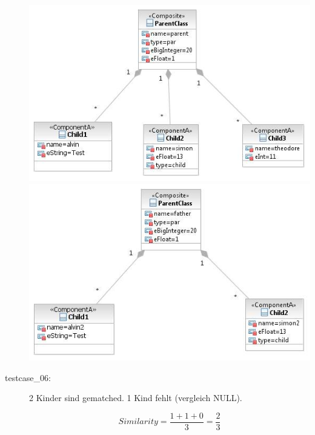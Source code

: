\documentclass[a4paper]{article}
\begin{document}
\begin{description}
	\includegraphics[scale=0.5]{CompareChildrenMatchedOrSimilarTestScreens/Testcase05model1.jpeg}
	\includegraphics[scale=0.5]{CompareChildrenMatchedOrSimilarTestScreens/Testcase05model2.jpeg}

  \item[testcase\_06:]  2 Kinder sind gematched. 1 Kind fehlt (vergleich NULL).
    
   \begin{equation*}
   Similarity = \frac{1+1+0}{3}=\frac{2}{3}
   \end{equation*}
    

\end{description}
\end{document}
